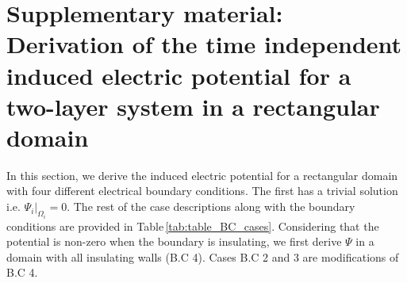 \documentclass[aps,prfluids,reprint,superscriptaddress]{revtex4-2}
\numberwithin{equation}{section}
\begin{document}
\section{Supplementary material: Derivation of the time independent induced electric potential for a two-layer system in a rectangular domain}
\label{supplA}

In this section, we derive the induced electric potential for a rectangular domain with four different electrical boundary conditions. The first has a trivial solution i.e. $\Psi_i|_{\Omega_i} = 0$. The rest of the case descriptions along with the boundary conditions are provided in Table\,\ref{tab:table_BC_cases}. Considering that the potential is non-zero when the boundary is insulating, we first derive $\Psi$ in a domain with all insulating walls (B.C 4). Cases B.C 2 and 3 are modifications of B.C 4. 
\end{document}
